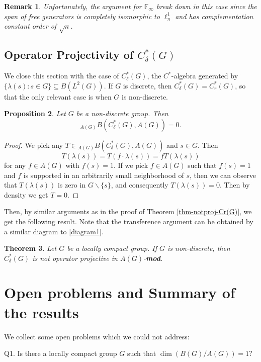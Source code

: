 \documentclass[10pt]{amsart}
\newtheorem{thm}{Theorem}
\newtheorem{prop}[thm]{Proposition}
\newtheorem{rem}[thm]{Remark}
\numberwithin{thm}{section}
\numberwithin{equation}{section}
\begin{document}
	\begin{rem}{\rm 
	Unfortunately, the argument for $\mathbb{F}_\infty$ break down in this case since the span of free generators is completely isomorphic to $\ell^1_n$
	and has complementation constant order of $\sqrt{n}$.
	}
	\end{rem}

\subsection{Operator Projectivity of $C^*_\delta(G)$}
We close this section with the case of $C^*_\delta(G)$, the $C^*$-algebra generated by $\{\lambda(s) : s\in G\} \subseteq B(L^2(G))$.
If $G$ is discrete, then $C^*_\delta(G) = C^*_r(G)$, so that the only relevant case is when $G$ is non-discrete. 

	\begin{prop}\label{prop-trivial-mapping-space-C*delta}
	Let $G$ be a non-discrete group. Then
		$${}_{A(G)}B(C^*_\delta(G), A(G)) = 0.$$
	\end{prop}
	\begin{proof}
We pick any $T \in {}_{A(G)}B(C^*_\delta(G), A(G))$ and $s\in G$. Then
	$$T(\lambda(s)) = T(f\cdot \lambda(s)) = f T(\lambda(s))$$
for any $f\in A(G)$ with $f(s) = 1$.
If we pick $f \in A(G)$ such that $f(s) = 1$ and $f$ is supported in an arbitrarily small neighborhood of $s$,
then we can observe that $T(\lambda(s))$ is zero in $G \backslash \{s\}$, and consequently $T(\lambda(s)) = 0$.
Then by density we get $T = 0$. 
\end{proof}

Then, by similar arguments as in the proof of Theorem \ref{thm-notproj-Cr(G)}, we get the following result.
Note that the transference argument can be obtained by a similar diagram to \eqref{diagram1}.

	\begin{thm}\label{thm-C*delta}
	Let $G$ be a locally compact group. If $G$ is non-discrete, then $C^*_\delta(G)$ is not operator projective in $A(G)$-{\bf mod}.
	\end{thm}

\section{Open problems and Summary of the results}
We collect some open problems which we could not address:
\vspace{0.5cm}

Q1. Is there a locally compact group $G$ such that $\dim(B(G)/A(G))=1?$
\vspace{0.3cm}
\end{document}
